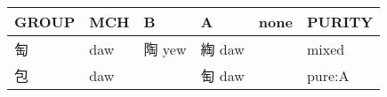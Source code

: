 \documentclass[14pt,a4paper]{scrartcl}
\begin{document}
\begin{longtable}[c]{@{}llllll@{}}
\toprule
\begin{minipage}[b]{0.14\columnwidth}\raggedright\strut
GROUP
\strut\end{minipage} &
\begin{minipage}[b]{0.14\columnwidth}\raggedright\strut
MCH
\strut\end{minipage} &
\begin{minipage}[b]{0.14\columnwidth}\raggedright\strut
B
\strut\end{minipage} &
\begin{minipage}[b]{0.14\columnwidth}\raggedright\strut
A
\strut\end{minipage} &
\begin{minipage}[b]{0.14\columnwidth}\raggedright\strut
none
\strut\end{minipage} &
\begin{minipage}[b]{0.14\columnwidth}\raggedright\strut
PURITY
\strut\end{minipage}\tabularnewline
\midrule
\endhead
\begin{minipage}[t]{0.14\columnwidth}\raggedright\strut
匋
\strut\end{minipage} &
\begin{minipage}[t]{0.14\columnwidth}\raggedright\strut
daw
\strut\end{minipage} &
\begin{minipage}[t]{0.14\columnwidth}\raggedright\strut
陶 yew
\strut\end{minipage} &
\begin{minipage}[t]{0.14\columnwidth}\raggedright\strut
綯 daw
\strut\end{minipage} &
\begin{minipage}[t]{0.14\columnwidth}\raggedright\strut
\strut\end{minipage} &
\begin{minipage}[t]{0.14\columnwidth}\raggedright\strut
mixed
\strut\end{minipage}\tabularnewline
\begin{minipage}[t]{0.14\columnwidth}\raggedright\strut
包
\strut\end{minipage} &
\begin{minipage}[t]{0.14\columnwidth}\raggedright\strut
daw
\strut\end{minipage} &
\begin{minipage}[t]{0.14\columnwidth}\raggedright\strut
\strut\end{minipage} &
\begin{minipage}[t]{0.14\columnwidth}\raggedright\strut
匋 daw
\strut\end{minipage} &
\begin{minipage}[t]{0.14\columnwidth}\raggedright\strut
\strut\end{minipage} &
\begin{minipage}[t]{0.14\columnwidth}\raggedright\strut
pure:A
\strut\end{minipage}\tabularnewline
\bottomrule
\end{longtable}
\end{document}
